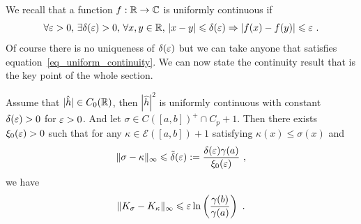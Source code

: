 We recall that a function $f:\mathbb{R}\rightarrow\mathbb{C}$ is uniformly continuous if
\begin{equation}\label{eq_uniform_continuity}
	\forall \varepsilon>0,\, \exists \delta(\varepsilon)>0,\, \forall x,y\in\mathbb{R},\, |x-y|\leqslant \delta(\varepsilon) \Rightarrow |f(x)-f(y)|\leqslant \varepsilon\ .
\end{equation}
Of course there is no uniqueness of $\delta(\varepsilon)$ but we can take anyone that satisfies equation~\eqref{eq_uniform_continuity}. We can now state the continuity result that is the key point of the whole section.

\begin{prop}\label{prop_continuity_kernel}
	Assume that $|\hat{h}|\in C_0(\mathbb{R})$, then $|\hat{h}|^2$ is uniformly continuous with constant $\delta(\varepsilon)>0$ for $\varepsilon>0$. And let $\sigma\in C([a,b])^+\cap C_p +1$. Then there exists $\xi_0(\varepsilon)>0$ such that for any $\kappa\in \mathcal{E}([a,b])+1$ satisfying $\kappa(x)\leqslant \sigma(x)$ and
	\begin{equation}
		\| \sigma - \kappa \|_{\infty} \leqslant \tilde{\delta}(\varepsilon) := \frac{\delta(\varepsilon)\gamma(a)}{\xi_0(\varepsilon)}\ ,
	\end{equation}
	we have
	\begin{equation}
		\| K_\sigma - K_\kappa \|_{\infty} \leqslant \varepsilon \ln\left(\frac{\gamma(b)}{\gamma(a)}\right)\ .
	\end{equation}
\end{prop}
